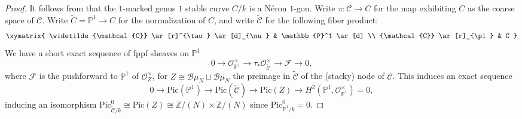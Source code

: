 \documentclass[11pt]{amsart}
\theoremstyle{definition}
\begin{document}
\begin{proof}
It follows from \cite[II.1.15]{DR} that the $1$-marked genus $1$ stable curve $C/k$ is a N\'eron $1$-gon. Write $\pi: {\mathcal{C}} \rightarrow C$ for the map exhibiting $C$ as the coarse space of ${\mathcal{C}}$. Write $\widetilde{C} = \mathbb{P}^1 \rightarrow C$ for the normalization of $C$, and write $\widetilde{\mathcal{C}}$ for the following fiber product:
\begin{align*}
\xymatrix{ 
  \widetilde{\mathcal{C}} \ar[r]^{\tau} \ar[d]_{\nu} & \mathbb{P}^1 \ar[d] \\
  {\mathcal{C}} \ar[r]_{\pi} & C }
\end{align*}
We have a short exact sequence of fppf sheaves on $\mathbb{P}^1$ 
\begin{displaymath}
0 \rightarrow {\mathcal{O}}^\times_{\mathbb{P}^1} \rightarrow \tau_* {\mathcal{O}}^\times_{\widetilde{\mathcal{C}}} \rightarrow {\mathcal{F}} \rightarrow 0,
\end{displaymath}
where ${\mathcal{F}}$ is the pushforward to $\mathbb{P}^1$ of ${\mathcal{O}}^\times_Z$, for $Z \cong {\mathcal{B}}\mu_N \sqcup {\mathcal{B}}\mu_N$ the preimage in $\widetilde{\mathcal{C}}$ of the (stacky) node of ${\mathcal{C}}$. This induces an exact sequence 
\begin{displaymath}
0 \rightarrow \mathrm{Pic}(\mathbb{P}^1) \rightarrow \mathrm{Pic}(\widetilde{\mathcal{C}}) \rightarrow \mathrm{Pic}(Z) \rightarrow H^2(\mathbb{P}^1,{\mathcal{O}}^\times_{\mathbb{P}^1}) = 0,
\end{displaymath}
inducing an isomorphism $\mathrm{Pic}^0_{\widetilde{\mathcal{C}}/k} \cong \mathrm{Pic}(Z) \cong \mathbb{Z}/(N) \times \mathbb{Z}/(N)$ since $\mathrm{Pic}^0_{\mathbb{P}^1/k} = 0$.


\end{proof}
\end{document}
